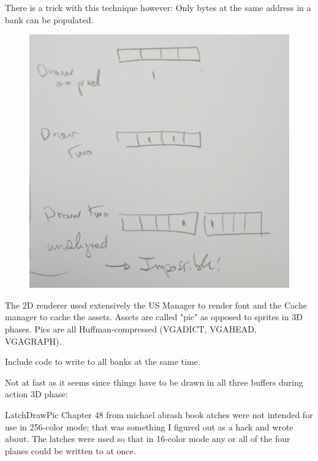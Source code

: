 

There is a trick with this technique however: Only bytes at the same address in a bank can be populated.
\begin{figure}[H]
  \centering
 \includegraphics[width=\textwidth]{imgs/drawings/vga_multiple_pixel_write.png}
\end{figure}

The 2D renderer used extensively the US Manager to render font and the Cache manager to cache the assets.
Assets are called "pic" as opposed to sprites in 3D phases. Pics  are all Huffman-compressed (VGADICT, VGAHEAD, 
VGAGRAPH).
\par
{}
Include code to write to all banks at the same time.

Not at fast as it seems since things have to be drawn in all three buffers during action 3D phase:\\
\par

\begin{minipage}{\textwidth}

\end{minipage}


LatchDrawPic
Chapter 48 from michael abrash book
atches were not intended for use in 256-color mode; that was something I figured out as a hack and wrote about. The latches were used so that in 16-color mode any or all of the four planes could be written to at once.

